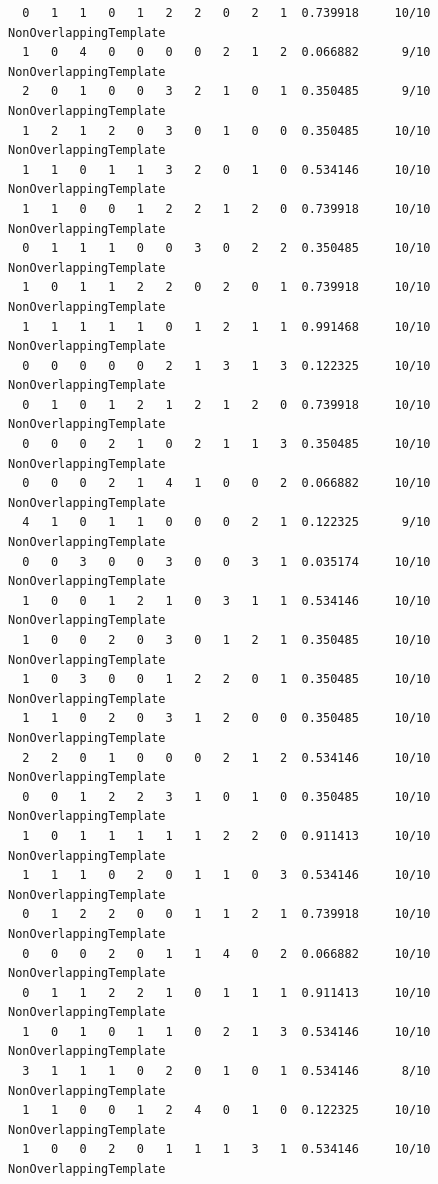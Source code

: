 \documentclass[12pt, titlepage]{report}
\theoremstyle{definition}
\begin{document}
\begin{verbatim}
  0   1   1   0   1   2   2   0   2   1  0.739918     10/10      NonOverlappingTemplate
  1   0   4   0   0   0   0   2   1   2  0.066882      9/10      NonOverlappingTemplate
  2   0   1   0   0   3   2   1   0   1  0.350485      9/10      NonOverlappingTemplate
  1   2   1   2   0   3   0   1   0   0  0.350485     10/10      NonOverlappingTemplate
  1   1   0   1   1   3   2   0   1   0  0.534146     10/10      NonOverlappingTemplate
  1   1   0   0   1   2   2   1   2   0  0.739918     10/10      NonOverlappingTemplate
  0   1   1   1   0   0   3   0   2   2  0.350485     10/10      NonOverlappingTemplate
  1   0   1   1   2   2   0   2   0   1  0.739918     10/10      NonOverlappingTemplate
  1   1   1   1   1   0   1   2   1   1  0.991468     10/10      NonOverlappingTemplate
  0   0   0   0   0   2   1   3   1   3  0.122325     10/10      NonOverlappingTemplate
  0   1   0   1   2   1   2   1   2   0  0.739918     10/10      NonOverlappingTemplate
  0   0   0   2   1   0   2   1   1   3  0.350485     10/10      NonOverlappingTemplate
  0   0   0   2   1   4   1   0   0   2  0.066882     10/10      NonOverlappingTemplate
  4   1   0   1   1   0   0   0   2   1  0.122325      9/10      NonOverlappingTemplate
  0   0   3   0   0   3   0   0   3   1  0.035174     10/10      NonOverlappingTemplate
  1   0   0   1   2   1   0   3   1   1  0.534146     10/10      NonOverlappingTemplate
  1   0   0   2   0   3   0   1   2   1  0.350485     10/10      NonOverlappingTemplate
  1   0   3   0   0   1   2   2   0   1  0.350485     10/10      NonOverlappingTemplate
  1   1   0   2   0   3   1   2   0   0  0.350485     10/10      NonOverlappingTemplate
  2   2   0   1   0   0   0   2   1   2  0.534146     10/10      NonOverlappingTemplate
  0   0   1   2   2   3   1   0   1   0  0.350485     10/10      NonOverlappingTemplate
  1   0   1   1   1   1   1   2   2   0  0.911413     10/10      NonOverlappingTemplate
  1   1   1   0   2   0   1   1   0   3  0.534146     10/10      NonOverlappingTemplate
  0   1   2   2   0   0   1   1   2   1  0.739918     10/10      NonOverlappingTemplate
  0   0   0   2   0   1   1   4   0   2  0.066882     10/10      NonOverlappingTemplate
  0   1   1   2   2   1   0   1   1   1  0.911413     10/10      NonOverlappingTemplate
  1   0   1   0   1   1   0   2   1   3  0.534146     10/10      NonOverlappingTemplate
  3   1   1   1   0   2   0   1   0   1  0.534146      8/10      NonOverlappingTemplate
  1   1   0   0   1   2   4   0   1   0  0.122325     10/10      NonOverlappingTemplate
  1   0   0   2   0   1   1   1   3   1  0.534146     10/10      NonOverlappingTemplate

\end{verbatim}
\end{document}
